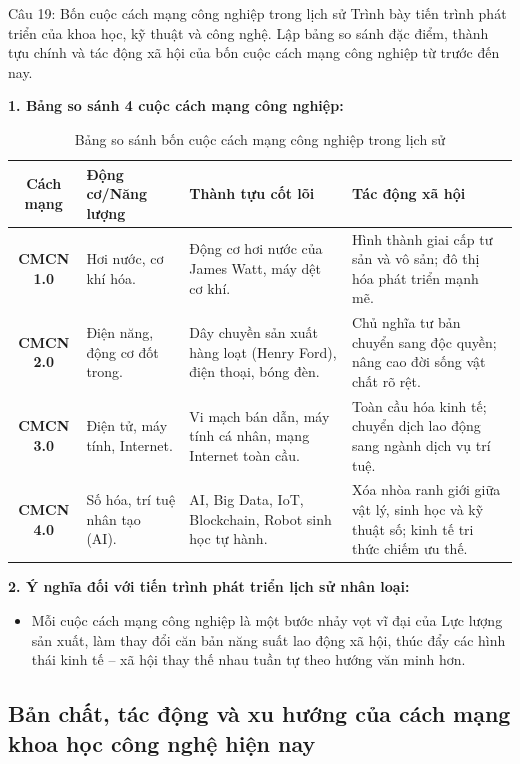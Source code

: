 \documentclass[12pt,a4paper]{article}
\begin{document}
{\begin{questionbox}{Câu 19: Bốn cuộc cách mạng công nghiệp trong lịch sử}
Trình bày tiến trình phát triển của khoa học, kỹ thuật và công nghệ. Lập bảng so sánh đặc điểm, thành tựu chính và tác động xã hội của bốn cuộc cách mạng công nghiệp từ trước đến nay.
\end{questionbox}

\noindent
\textbf{1. Bảng so sánh 4 cuộc cách mạng công nghiệp:}
\begin{table}[H]
\centering
\fontsize{10}{12}\selectfont
\renewcommand{\arraystretch}{1.3}
\begin{tabularx}{\linewidth}{|c|l|X|X|}
\hline
\textbf{Cách mạng} & \textbf{Động cơ/Năng lượng} & \textbf{Thành tựu cốt lõi} & \textbf{Tác động xã hội} \\ \hline
\textbf{CMCN 1.0} & Hơi nước, cơ khí hóa. & Động cơ hơi nước của James Watt, máy dệt cơ khí. & Hình thành giai cấp tư sản và vô sản; đô thị hóa phát triển mạnh mẽ. \\ \hline
\textbf{CMCN 2.0} & Điện năng, động cơ đốt trong. & Dây chuyền sản xuất hàng loạt (Henry Ford), điện thoại, bóng đèn. & Chủ nghĩa tư bản chuyển sang độc quyền; nâng cao đời sống vật chất rõ rệt. \\ \hline
\textbf{CMCN 3.0} & Điện tử, máy tính, Internet. & Vi mạch bán dẫn, máy tính cá nhân, mạng Internet toàn cầu. & Toàn cầu hóa kinh tế; chuyển dịch lao động sang ngành dịch vụ trí tuệ. \\ \hline
\textbf{CMCN 4.0} & Số hóa, trí tuệ nhân tạo (AI). & AI, Big Data, IoT, Blockchain, Robot sinh học tự hành. & Xóa nhòa ranh giới giữa vật lý, sinh học và kỹ thuật số; kinh tế tri thức chiếm ưu thế. \\ \hline
\end{tabularx}
\caption{Bảng so sánh bốn cuộc cách mạng công nghiệp trong lịch sử}
\end{table}

\noindent
\textbf{2. Ý nghĩa đối với tiến trình phát triển lịch sử nhân loại:}
\begin{itemize}
    \item Mỗi cuộc cách mạng công nghiệp là một bước nhảy vọt vĩ đại của Lực lượng sản xuất, làm thay đổi căn bản năng suất lao động xã hội, thúc đẩy các hình thái kinh tế -- xã hội thay thế nhau tuần tự theo hướng văn minh hơn.
\end{itemize}

\subsection{Bản chất, tác động và xu hướng của cách mạng khoa học công nghệ hiện nay}

}
\end{document}
